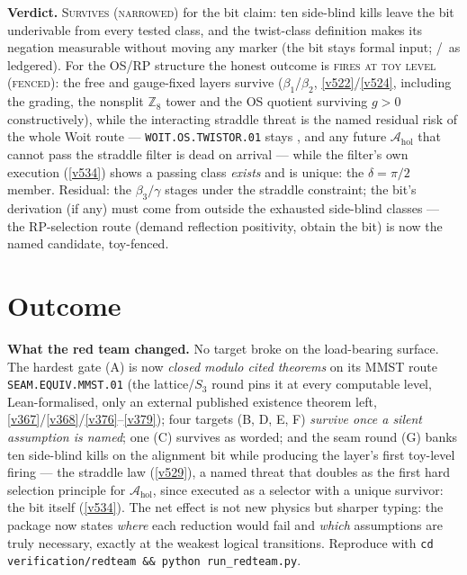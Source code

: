 \documentclass[11pt,a4paper]{article}
\providecommand{\Z}{\mathbb{Z}}
\begin{document}
\noindent\textbf{Verdict.} \textsc{Survives (narrowed)} for the bit claim: ten side-blind kills
leave the bit underivable from every tested class, and the twist-class definition makes its
negation measurable without moving any marker (the bit stays formal input; \mC/\mO\ as ledgered).
For the OS/RP structure the honest outcome is \textsc{fires at toy level (fenced)}: the free and
gauge-fixed layers survive ($\beta_1$/$\beta_2$, \vref{v522}/\vref{v524}, including the grading,
the nonsplit $\Z_8$ tower and the OS quotient surviving $g>0$ constructively), while the
interacting straddle threat is the named residual risk of the whole Woit route ---
\texttt{WOIT.OS.TWISTOR.01} stays \mO, and any future $\mathcal A_{\mathrm{hol}}$ that cannot
pass the straddle filter is dead on arrival --- while the filter's own execution (\vref{v534})
shows a passing class \emph{exists} and is unique: the $\delta=\pi/2$ member. Residual: the
$\beta_3/\gamma$ stages under the straddle constraint; the bit's derivation (if any) must come
from outside the exhausted side-blind classes --- the RP-selection route (demand reflection
positivity, obtain the bit) is now the named candidate, toy-fenced.

\section*{Outcome}
\par\smallskip\noindent\textbf{What the red team changed.}
No target broke on the load-bearing surface. The hardest gate (A) is now \emph{closed modulo cited theorems} on its MMST route \texttt{SEAM.EQUIV.MMST.01} (the lattice/$S_3$ round pins it
at every computable level, Lean-formalised, only an external published existence theorem left,
\vref{v367}/\vref{v368}/\vref{v376}--\vref{v379});
four targets (B, D, E, F) \emph{survive once a silent assumption is named}; one (C) survives as
worded; and the seam round (G) banks ten side-blind kills on the alignment bit while producing
the layer's first toy-level firing --- the straddle law (\vref{v529}), a named threat that doubles
as the first hard selection principle for $\mathcal A_{\mathrm{hol}}$, since executed as a selector
with a unique survivor: the bit itself (\vref{v534}). The net effect is not new
physics but sharper typing: the package now states \emph{where}
each reduction would fail and \emph{which} assumptions are truly necessary, exactly at the weakest
logical transitions. Reproduce with \texttt{cd verification/redteam \&\& python run\_redteam.py}.
\end{document}
